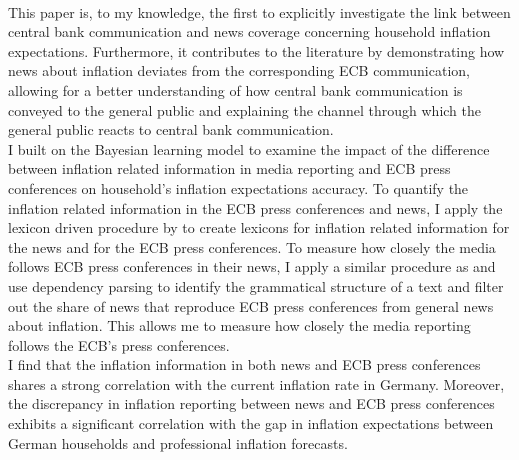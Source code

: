 \documentclass[review]{elsarticle}
\begin{document}
%
%
%
\\
This paper is, to my knowledge, the first to explicitly investigate the link between central bank communication and news coverage concerning household inflation expectations. Furthermore, it contributes to the literature by demonstrating how news about inflation deviates from the corresponding ECB communication, allowing for a better understanding of how central bank communication is conveyed to the general public and explaining the channel through which the general public reacts to central bank communication.
%
%
\\
I built on the Bayesian learning model \citep{LamlaLein2014} to examine the impact of the difference between inflation related information in media reporting and ECB press conferences on household's inflation expectations accuracy. To quantify the inflation related information in the ECB press conferences and news, I apply the lexicon driven procedure by \cite{PicaultRenault2017} to create lexicons for inflation related information for the news and for the ECB press conferences. To measure how closely the media follows ECB press conferences in their news, I apply a similar procedure as \cite{Picaultetal2022} and use dependency parsing to identify the grammatical structure of a text and filter out the share of news that reproduce ECB press conferences from general news about inflation. This allows me to measure how closely the media reporting follows the ECB's press conferences.
%
%
\\
I find that the inflation information in both news and ECB press conferences shares a strong correlation with the current inflation rate in Germany. Moreover, the discrepancy in inflation reporting between news and ECB press conferences exhibits a significant correlation with the gap in inflation expectations between German households and professional inflation forecasts.
\end{document}
